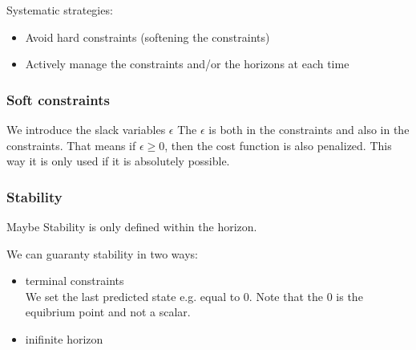 \documentclass[a4paper]{article}
\begin{document}
Systematic strategies:
\begin{itemize}
	\item Avoid hard constraints (softening the constraints)
	\item Actively manage the constraints and/or the horizons at each time
\end{itemize}

\subsubsection{Soft constraints}
We introduce the slack variables $ \epsilon $
The  $ \epsilon $ is both in the constraints and also in the constraints. That means if  $ \epsilon \geq 0 $, then the cost function is also penalized. This way it is only used if it is absolutely possible. 


\subsubsection{Stability}
Maybe Stability is only defined within the horizon.

We can guaranty stability in two ways:
\begin{itemize}
	\item terminal constraints\\
		We set the last predicted state e.g. equal to 0. Note that the 0 is the equibrium point and not a scalar.
	\item inifinite horizon\\
		
\end{itemize}
\end{document}
